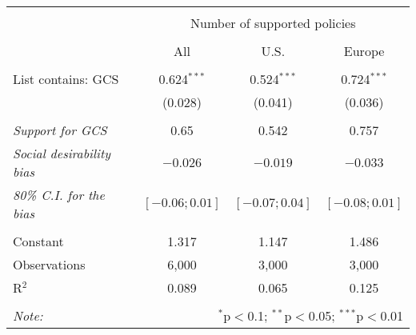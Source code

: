 
\begin{tabular}{@{\extracolsep{5pt}}lccc} 
\\[-1.8ex]\hline 
\hline \\[-1.8ex] 
 & \multicolumn{3}{c}{Number of supported policies} \\ 
\cline{2-4} 
\\[-1.8ex] & All & U.S. & Europe \\ 
\hline \\[-1.8ex] 
 List contains: GCS & 0.624$^{***}$ & 0.524$^{***}$ & 0.724$^{***}$ \\ 
  & (0.028) & (0.041) & (0.036) \\ 
\hline  \\[-1.8ex] \textit{Support for GCS} & 0.65  &  0.542  &  0.757 \\
\textit{Social desirability bias} & \textit{$ -0.026 $} & \textit{$ -0.019 $} & \textit{$ -0.033 $}\\
\textit{80\% C.I. for the bias} & \textit{ $[ -0.06 ; 0.01 ]$ } & \textit{ $[ -0.07 ; 0.04 ]$} & \textit{ $[ -0.08 ; 0.01 ]$}\\
 \hline \\[-1.8ex] 
Constant & 1.317 & 1.147 & 1.486 \\ 
Observations & 6,000 & 3,000 & 3,000 \\ 
R$^{2}$ & 0.089 & 0.065 & 0.125 \\ 
\hline 
\hline \\[-1.8ex] 
\textit{Note:}  & \multicolumn{3}{r}{$^{*}$p$<$0.1; $^{**}$p$<$0.05; $^{***}$p$<$0.01} \\ 
\end{tabular} 